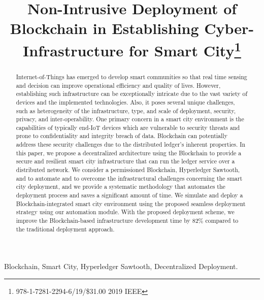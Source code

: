 \documentclass[conference]{IEEEtran}
\begin{document}
\title{Non-Intrusive Deployment of Blockchain in Establishing Cyber-Infrastructure for Smart City\thanks{978-1-7281-2294-6/19/\$31.00 \text{\textcopyright}2019 IEEE}}
% 

\author{
}

\maketitle

\begin{abstract} 
Internet-of-Things has emerged to develop smart communities so that real time sensing and decision can improve operational efficiency and quality of lives. However, establishing such infrastructure can be exceptionally intricate due to the vast variety of devices and the implemented technologies. Also, it poses several unique challenges, such as heterogeneity of the infrastructure, type, and scale of deployment, security, privacy, and inter-operability. One primary concern in a smart city environment is the capabilities of typically end-IoT devices which are vulnerable to security threats and prone to confidentiality and integrity breach of data. Blockchain can potentially address these security challenges due to the distributed ledger's inherent properties. In this paper, we propose a decentralized architecture using the Blockchain to provide a secure and resilient smart city infrastructure that can run the ledger service over a distributed network. We consider a permissioned Blockchain, Hyperledger Sawtooth, and to automate and to overcome the infrastructural challenges concerning the smart city deployment, and we provide a systematic methodology that automates the deployment process and saves a significant amount of time. We simulate and deploy a Blockchain-integrated smart city environment using the proposed seamless deployment strategy using our automation module. With the proposed deployment scheme, we improve the Blockchain-based infrastructure development time by 82\% compared to the traditional deployment approach.
\end{abstract}

\begin{IEEEkeywords}
Blockchain, Smart City, Hyperledger Sawtooth, Decentralized Deployment. 
\end{IEEEkeywords}










\end{document}
